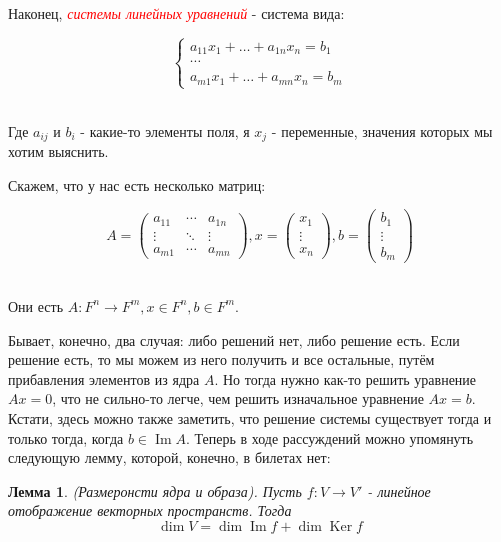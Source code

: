 \documentclass[a4paper,100pt]{article}
\theoremstyle{indented}
\newtheorem{lemma}{Лемма}
\theoremstyle{definition}
\theoremstyle{remark}
\DeclareMathOperator{\Ker}{Ker}
\DeclareMathOperator{\Imf}{Im}
\begin{document}
Наконец, \hypertarget{n63}{\textcolor{red}{\textit{системы линейных уравнений}}} - система вида:

\begin{equation*}
    \begin{cases}
        a_{11}x_1+\dots+a_{1n}x_n=b_1\\
        \cdots \\
        a_{m1}x_1+\dots+a_{mn}x_n=b_m
    \end{cases}
\end{equation*}\

Где $a_{ij}$ и $b_i$ - какие-то элементы поля, я $x_j$ - переменные, значения которых мы хотим выяснить.\ 

Скажем, что у нас есть несколько матриц:

\begin{equation*}
    A = 
    \begin{pmatrix}
        a_{11} & \cdots & a_{1n} \\
        \vdots & \ddots & \vdots \\
        a_{m1} & \cdots & a_{mn}
    \end{pmatrix},
    x=
    \begin{pmatrix}
        x_1 \\
        \vdots \\
        x_n
    \end{pmatrix},
    b=
    \begin{pmatrix}
        b_1 \\
        \vdots \\
        b_m
    \end{pmatrix}
\end{equation*}\

Они есть $A: F^n\rightarrow F^m, x\in F^n, b\in F^m$.\ 

Бывает, конечно, два случая: либо решений нет, либо решение есть. Если решение есть, то мы можем из него получить и все остальные, путём прибавления элементов из ядра $A$. Но тогда нужно как-то решить уравнение $Ax=0$, что не сильно-то легче, чем решить изначальное уравнение $Ax=b$. Кстати, здесь можно также заметить, что решение системы существует тогда и только тогда, когда $b\in \Imf A$. Теперь в ходе рассуждений можно упомянуть следующую лемму, которой, конечно, в билетах нет:\\

\begin{lemma}
    (Размеронсти ядра и образа). Пусть $f: V\rightarrow V'$ - линейное отображение векторных пространств. Тогда
    \[
        \dim V = \dim \Imf f +\dim \Ker f
    \]
\end{lemma}
\end{document}
